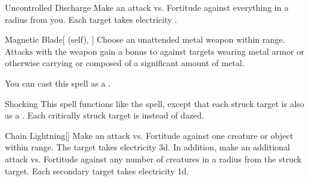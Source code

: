 \lowercase{\hypertarget{spell:Uncontrolled Discharge}{}}\label{spell:Uncontrolled Discharge}
\begin{ability}[\nth{2}]{\hypertarget{spell:Uncontrolled Discharge}{Uncontrolled Discharge}}
Make an attack vs. Fortitude against everything in a \areamed radius from you.
\hit Each target takes electricity .
\end{ability}
\vspace{0.25em}



\lowercase{\hypertarget{spell:Magnetic Blade}{}}\label{spell:Magnetic Blade}
\begin{ability}[\nth{3}]{\hypertarget{spell:Magnetic Blade}{Magnetic Blade}}[ (self), ]
Choose an unattended metal weapon within \rngclose range.
Attacks with the weapon gain a  bonus to  against targets wearing metal armor or otherwise carrying or composed of a significant amount of metal.

You can cast this spell as a .
\end{ability}
\vspace{0.25em}



\lowercase{\hypertarget{spell:Shocking}{}}\label{spell:Shocking}
\begin{ability}[\nth{3}]{\hypertarget{spell:Shocking}{Shocking}}
This spell functions like the  spell, except that each struck target is also  as a .
Each critically struck target is  instead of dazed.
\end{ability}
\vspace{0.25em}



\lowercase{\hypertarget{spell:Chain Lightning}{}}\label{spell:Chain Lightning}
\begin{ability}[\nth{4}]{\hypertarget{spell:Chain Lightning}{Chain Lightning}}[]
Make an attack vs. Fortitude against one creature or object within \rngmed range.
\hit The target takes electricity  \plus3d.
In addition, make an additional attack vs. Fortitude against any number of creatures in a \areamed radius from the struck target.
\hit Each secondary target takes electricity  \plus1d.
\end{ability}
\vspace{0.25em}



